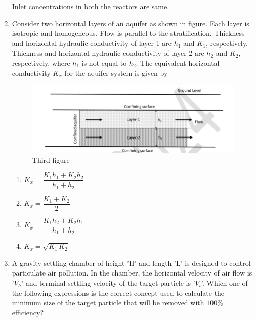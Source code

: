 \documentclass[journal]{IEEEtran}
\numberwithin{equation}{enumi}
\numberwithin{figure}{enumi}
\begin{document}
\begin{enumerate}[start=1, label={Q\arabic*.}]
Inlet concentrations in both the reactors are same.
 \begin{enumerate}[label=(\Alph*)]
  \end{enumerate}
\item Consider two horizontal layers of an aquifer as shown in figure. Each layer is isotropic
and homogeneous. Flow is parallel to the stratification. Thickness and horizontal
hydraulic conductivity of layer-1 are $h_1$ and $K_1$, respectively. Thickness and horizontal
hydraulic conductivity of layer-2 are $h_2$ and $K_2$, respectively, where $h_1$ is not equal to $h_2$.
The equivalent horizontal conductivity $K_x$ for the aquifer system is given by \underline{\hspace{1.5cm}}
\begin{figure}[H]
    \centering
    \includegraphics[width=0.6\linewidth]{figs/fig3.png}
    \caption{Third figure}
    \label{fig:third}
\end{figure}
\newpage
\begin{enumerate}[label=(\Alph*)]
    \item $K_x = \dfrac{K_1 h_1 + K_2 h_2}{h_1 + h_2}$
    \item $K_x = \dfrac{K_1 + K_2}{2}$
    \item $K_x = \dfrac{K_1 h_2 + K_2 h_1}{h_1 + h_2}$
    \item $K_x = \sqrt{K_1 \, K_2}$
\end{enumerate}

\item A gravity settling chamber of height 'H' and length 'L' is designed to control particulate
air pollution. In the chamber, the horizontal velocity of air flow is '$V_h$' and terminal
settling velocity of the target particle is '$V_t$'.
Which one of the following expressions is the correct concept used to calculate the
minimum size of the target particle that will be removed with $100\%$ efficiency?
 \begin{enumerate}[label=(\Alph*)]
  \end{enumerate}
  

\end{enumerate}
\end{document}
